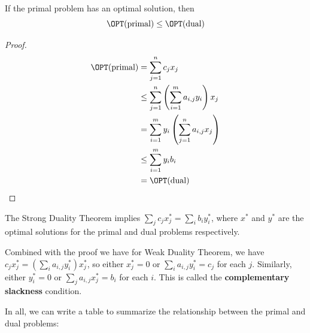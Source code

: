 \begin{theorem}
	If the primal problem has an optimal solution, then
	\[ \OPT(\text{primal}) \leq \OPT(\text{dual}) \]
\end{theorem}
\begin{proof}
	\begin{align*}
		\OPT(\text{primal}) & = \sum_{j=1}^n c_j x_j                                        \\
		                    & \leq \sum_{j=1}^n \left( \sum_{i=1}^m a_{i,j} y_i \right) x_j \\
		                    & = \sum_{i=1}^m y_i \left( \sum_{j=1}^n a_{i,j} x_j \right)    \\
		                    & \leq \sum_{i=1}^m y_i b_i                                     \\
		                    & = \OPT(\text{dual})
	\end{align*}
\end{proof}

The Strong Duality Theorem implies $\sum_j c_j x_j^* = \sum_i b_i y_i^*$, where $x^*$ and $y^*$ are the optimal solutions for the primal and dual problems respectively.

Combined with the proof we have for Weak Duality Theorem, we have $c_j x_j^* = (\sum_i a_{i,j} y_i^*) x_j^*$, so either $x_j^* = 0$ or $\sum_i a_{i,j} y_i^* = c_j$ for each $j$. Similarly, either $y_i^* = 0$ or $\sum_j a_{i,j} x_j^* = b_i$ for each $i$. This is called the \textbf{complementary slackness} condition.

In all, we can write a table to summarize the relationship between the primal and dual problems:


